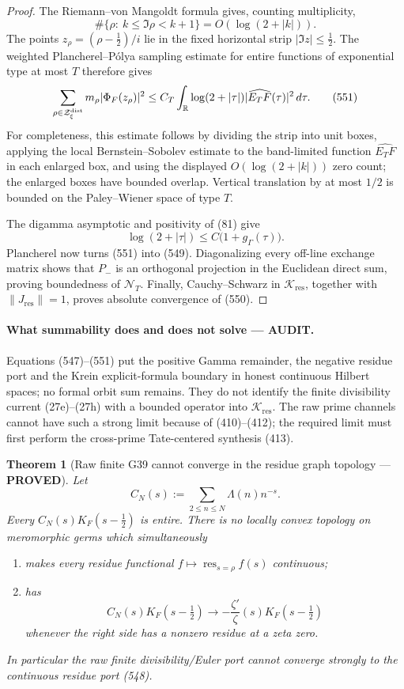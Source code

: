\documentclass[11pt]{article}
\newtheorem{theorem}{Theorem}
\newcommand{\PROVED}{\textcolor{green!45!black}{\textbf{PROVED}}}
\newcommand{\AUDIT}{\textcolor{orange!75!black}{\textbf{AUDIT}}}
\begin{document}
\begin{proof}
The Riemann--von Mangoldt formula gives, counting multiplicity,
\[
 \#\{\rho:\ k\le\Im\rho<k+1\}=O(\log(2+|k|)).
\]
The points \(z_\rho=(\rho-\frac12)/i\) lie in the fixed horizontal strip
\(|\Im z|\le\frac12\).  The weighted Plancherel--Pólya sampling estimate
for entire functions of exponential type at most \(T\) therefore gives
\begin{equation}
 \sum_{\rho\in\mathcal Z_\xi^{\rm dist}}
       m_\rho|\Phi_F(z_\rho)|^2
 \le C_T\int_{\mathbb R}\log(2+|\tau|)
                |\widehat{E_TF}(\tau)|^2\,d\tau .             \tag{551}
\end{equation}
For completeness, this estimate follows by dividing the strip into unit
boxes, applying the local Bernstein--Sobolev estimate to the band-limited
function \(\widehat{E_TF}\) in each enlarged box, and using the displayed
\(O(\log(2+|k|))\) zero count; the enlarged boxes have bounded overlap.
Vertical translation by at most \(1/2\) is bounded on the
Paley--Wiener space of type \(T\).

The digamma asymptotic and positivity of (81) give
\[
 \log(2+|\tau|)\le C\bigl(1+g_\Gamma(\tau)\bigr).
\]
Plancherel now turns (551) into (549).  Diagonalizing every off-line
exchange matrix shows that \(P_-\) is an orthogonal projection in the
Euclidean direct sum, proving boundedness of \(\mathcal N_T\).
Finally, Cauchy--Schwarz in \(\mathscr K_{\mathrm{res}}\), together with
\(\|J_{\mathrm{res}}\|=1\), proves absolute convergence of (550).
\end{proof}

\paragraph{What summability does and does not solve --- \AUDIT.}
Equations (547)--(551) put the positive Gamma remainder, the negative
residue port and the Krein explicit-formula boundary in honest continuous
Hilbert spaces; no formal orbit sum remains.  They do not identify the
finite divisibility current (27e)--(27h) with a bounded operator into
\(\mathscr K_{\mathrm{res}}\).  The raw prime channels cannot have such a
strong limit because of (410)--(412); the required limit must first perform
the cross-prime Tate-centered synthesis (413).

\begin{theorem}[Raw finite G39 cannot converge in the residue graph topology
--- \PROVED]
Let
\[
 C_N(s):=\sum_{2\le n\le N}\Lambda(n)n^{-s}.
\]
Every \(C_N(s)K_F(s-\frac12)\) is entire.  There is no locally convex
topology on meromorphic germs which simultaneously
\begin{enumerate}
\item makes every residue functional
      \(f\mapsto\operatorname{res}_{s=\rho}f(s)\) continuous;
\item has
      \[
       C_N(s)K_F(s-\tfrac12)\longrightarrow
       -\frac{\zeta'}{\zeta}(s)K_F(s-\tfrac12)
      \]
      whenever the right side has a nonzero residue at a zeta zero.
\end{enumerate}
In particular the raw finite divisibility/Euler port cannot converge
strongly to the continuous residue port (548).
\end{theorem}
\end{document}
